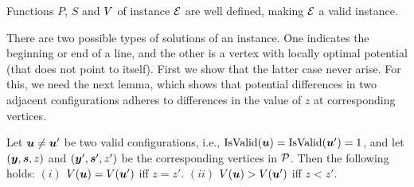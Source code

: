 \begin{lemma}\label{lem:PSF}
Functions $P$, $S$ and $\mbox{$V$}$ of instance $\mbox{${\mathcal E}$}$ are well defined, making $\mbox{${\mathcal E}$}$ a valid \EOPL instance. 
\end{lemma}

There are two possible types of solutions of an \EOPL instance. One indicates
the beginning or end of a line, and the other is a vertex with locally optimal
potential (that does not point to itself). 
First we show that the latter case never arise. For this, we need the
next lemma, which shows that potential differences in two adjacent
configurations adheres to differences in the value of $z$ at corresponding
vertices.

\begin{lemma}\label{lem:pot}
Let $\mbox{\boldmath $u$} \neq \mbox{\boldmath $u$}'$ be two valid configurations, i.e.,
	$\mbox{IsValid}(\mbox{\boldmath $u$})=\mbox{IsValid}(\mbox{\boldmath $u$}')=1$, and let $(\mbox{\boldmath $y$},\mbox{\boldmath $s$},z)$ and $(\mbox{\boldmath $y$}',\mbox{\boldmath $s$}',z')$
	be the corresponding vertices in $\mbox{${\mathcal P}$}$. Then the following holds: $(i)$
	$\mbox{$V$}(\mbox{\boldmath $u$})=\mbox{$V$}(\mbox{\boldmath $u$}')$ iff $z=z'$. $(ii)$ $\mbox{$V$}(\mbox{\boldmath $u$})>\mbox{$V$}(\mbox{\boldmath $u$}')$ iff $z<z'$.
\end{lemma}
%
%

